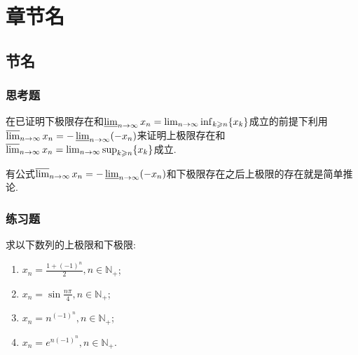 \documentclass[cn,chinese,founder]{elegantbook}
\begin{document}
\chapter{章节名}
 \section{节名}
  \subsection{思考题}
      \begin{example}
          在已证明下极限存在和$\varliminf_{n\to\infty}x_n=\lim_{n\to\infty}\inf_{k\geqslant n}\{x_k\}$成立的前提下利用$\varlimsup_{n\to\infty}x_n=-\varliminf_{n\to\infty}(-x_n)$来证明上极限存在和$\varlimsup_{n\to\infty}x_n=\lim_{n\to\infty}\sup_{k\geqslant n}\{x_k\}$成立.
      \end{example}
      \begin{solution}
          有公式$\varlimsup_{n\to\infty}x_n=-\varliminf_{n\to\infty}(-x_n)$和下极限存在之后上极限的存在就是简单推论.
      \end{solution}

  \subsection{练习题}
      \begin{exercise}
          求以下数列的上极限和下极限:
          \begin{enumerate}
              \item $x_n=\frac{1+(-1)^n}{2},n\in\mathbb{N}_+$;
                    \begin{solution}

                    \end{solution}
              \item $x_n=\sin\frac{n\pi}{4},n\in\mathbb{N}_+$;
              \item $x_n=n^{(-1)^n},n\in\mathbb{N}_+$;
              \item $x_n=e^{n(-1)^n},n\in\mathbb{N}_+$.
          \end{enumerate}
      \end{exercise}
\end{document}
